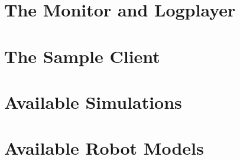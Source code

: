 
\section{The Monitor and Logplayer}


\section{The Sample Client}




\section{Available Simulations}

\section{Available Robot Models}



